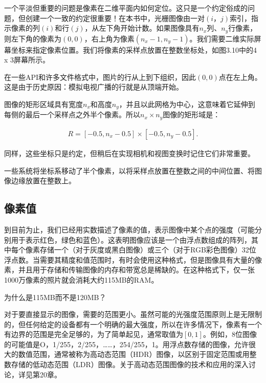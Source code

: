 \documentclass[lang=cn,12pt]{elegantbook}
\begin{document}
一个平淡但重要的问题是像素在二维平面内如何定位。这只是一个约定俗成的问题，但创建一个一致的约定很重要！在本书中，光栅图像由一对$(i，j)$索引，指示像素的列$(i)$和行$(j)$，从左下角开始计数。如果图像具有$n_x$列、$n_y$行像素，则左下角的像素为$(0,0)$，右上角为像素$(n_x-1,n_y-1)$。我们需要二维实际屏幕坐标来指定像素位置。我们将像素的采样点放置在整数坐标处，如图3.10中的4 x 3屏幕所示。

\begin{note}
在一些API和许多文件格式中，图片的行从上到下组织，因此$(0,0)$点在左上角。这是由于历史原因：模拟电视广播的行就是从顶端开始。
\end{note}

图像的矩形区域具有宽度$n_x$和高度$n_y$，并且以此网格为中心，这意味着它延伸到每侧的最后一个采样点之外半个像素。所以$n_x \times n_y$图像的矩形域是：

\[
  \begin{aligned}
  R=[-0.5,n_x-0.5]\times [-0.5,n_y-0.5].
  \end{aligned}
\]

同样，这些坐标只是约定，但稍后在实现相机和视图变换时记住它们非常重要。

\begin{note}
一些系统将坐标系移动了半个像素，以将采样点放置在整数之间的中间位置、将图像边缘放置在整数上。
\end{note}

\subsection{像素值}

到目前为止，我们已经用实数描述了像素的值，表示图像中某个点的强度（可能分别用于表示红色，绿色和蓝色）。这表明图像应该是一个由浮点数组成的阵列，其中每个像素存储一个（对于灰度或黑白图像）或三个（对于RGB彩色图像）32位浮点数。当需要其精度和值范围时，有时会使用这种格式，但是图像具有大量的像素，并且用于存储和传输图像的内存和带宽总是稀缺的。在这种格式下，仅一张1000万像素的照片就会消耗大约115MB的RAM。

\begin{note}
为什么是115MB而不是120MB？
\end{note}

对于要直接显示的图像，需要的范围更小。虽然可能的光强度范围原则上是无限制的，但任何给定的设备都有一个明确的最大强度，所以在许多情况下，像素有一个有边界的范围是完全足够的，为了简单起见，通常取值为$[0,1]$。例如，8位图像的可能值是O，1/255，2/255，……，254/255，1。用浮点数存储的图像，允许很大的数值范围，通常被称为高动态范围（HDR）图像，以区别于固定范围或用整数存储的低动态范围（LDR）图像。关于高动态范围图像的技术和应用的深入讨论，详见第20章。
\end{document}
